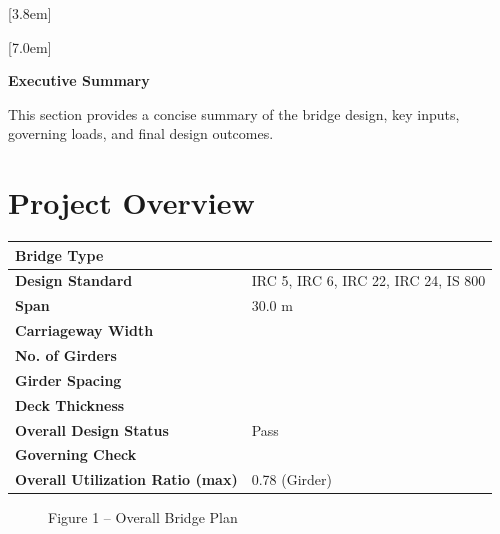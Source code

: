 \documentclass[12pt,a4paper]{report}
\numberwithin{table}{chapter}
\numberwithin{figure}{chapter}
\begin{document}
[3.8em]
  {\normalfont}
  {\contentslabel{2.3em}}
  {\hspace*{-2.3em}}
  {\hfill\contentspage}

[7.0em]
  {\normalfont}
  {\contentslabel{3.2em}}
  {\hspace*{-3.2em}}
  {\hfill\contentspage}

\newpage
\renewcommand{\contentsname}{\centering\Large\bfseries Table of Contents}
\tableofcontents


\newpage
{\centering\Large\bfseries Executive Summary\par}
\vspace{0.8em}

This section provides a concise summary of the bridge design, key inputs, governing loads, and final design outcomes.

\section*{Project Overview}
\label{sec:project-overview}


\begin{tabular}{|L{5.5cm}|L{8.5cm}|}
\hline
\textbf{Bridge Type} &  \\
\hline
\textbf{Design Standard} & IRC 5, IRC 6, IRC 22, IRC 24, IS 800 \\
\hline
\textbf{Span} & 30.0 m \\
\hline
\textbf{Carriageway Width} &  \\
\hline
\textbf{No. of Girders} &  \\
\hline
\textbf{Girder Spacing} &  \\
\hline
\textbf{Deck Thickness} &  \\
\hline
\textbf{Overall Design Status} & Pass \\
\hline
\textbf{Governing Check} &  \\
\hline
\textbf{Overall Utilization Ratio (max)} & 0.78 (Girder) \\
\hline
\end{tabular}


\begin{figure}[H]
\centering
{}
\caption*{Figure 1 -- Overall Bridge Plan}
\end{figure}

\newpage
\end{document}
